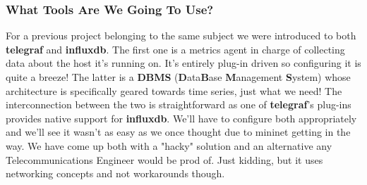 \documentclass[12pt]{article}
\begin{document}
		\subsubsection{What Tools Are We Going To Use?}
			For a previous project belonging to the same subject we were introduced to both \textbf{telegraf} and \textbf{influxdb}. The first one is a metrics agent in charge of collecting data about the host it's running on. It's entirely plug-in driven so configuring it is quite a breeze! The latter is a \textbf{DBMS} (\textbf{D}ata\textbf{B}ase \textbf{M}anagement \textbf{S}ystem) whose architecture is specifically geared towards time series, just what we need! The interconnection between the two is straightforward as one of \textbf{telegraf}'s plug-ins provides native support for \textbf{influxdb}. We'll have to configure both appropriately and we'll see it wasn't as easy as we once thought due to mininet getting in the way. We have come up both with a "hacky" solution and an alternative any Telecommunications Engineer would be prod of. Just kidding, but it uses networking concepts and not workarounds though.
\end{document}
